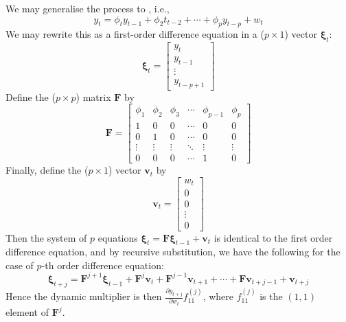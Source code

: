 We may generalise the process to , i.e.,
\begin{equation*}
y_t = \phi_t y_{t-1} + \phi_2 t_{t-2} + \cdots + \phi_p y_{t-p} + w_t \nonumber
\end{equation*}
We may rewrite this as a first-order difference equation in a ($p \times 1$) vector $\bm{\xi}_t$:
\begin{equation*}
\bm{\xi}_t =
\begin{bmatrix}
y_t \\
y_{t-1} \\
\vdots \\
y_{t-p+1}
\end{bmatrix} \nonumber
\end{equation*}
Define the ($p \times p$) matrix $\bm{F}$ by
\begin{equation*}
\bm{F} =
\begin{bmatrix}
\phi_1 & \phi_2 & \phi_3 & \cdots & \phi_{p-1} & \phi_p \\
1 & 0 & 0 & \cdots & 0 & 0 \\
0 & 1 & 0 & \cdots & 0 & 0 \\
\vdots & \vdots & \vdots & \ddots & \vdots & \vdots \\
0 & 0 & 0 & \cdots & 1 & 0
\end{bmatrix} \nonumber
\end{equation*}
Finally, define the ($p \times 1$) vector $\bm{v}_t$ by
\begin{equation*}
\bm{v}_t =
\begin{bmatrix}
w_t \\
0 \\
0 \\
\vdots \\
0
\end{bmatrix} \nonumber
\end{equation*}
Then the system of $p$ equations $\bm{\xi}_t = \bm{F} \bm{\xi}_{t-1} + \bm{v}_t$ is identical to the first order difference equation, and by recursive substitution, we have the following for the case of $p$-th order difference equation:
\begin{equation*}
\bm{\xi}_{t + j} = \bm{F}^{j+1} \bm{\xi}_{t-1} + \bm{F}^{j} \bm{v}_{t} + \bm{F}^{j-1} \bm{v}_{t+1} + \cdots + \bm{F} \bm{v}_{t+j-1} + \bm{v}_{t+j} \nonumber
\end{equation*}
Hence the dynamic multiplier is then $\frac{\partial y_{t+j}}{\partial w_t} f^{(j)}_{11}$, where $f^{(j)}_{11}$ is the $(1,1)$ element of $\bm{F}^j$.

